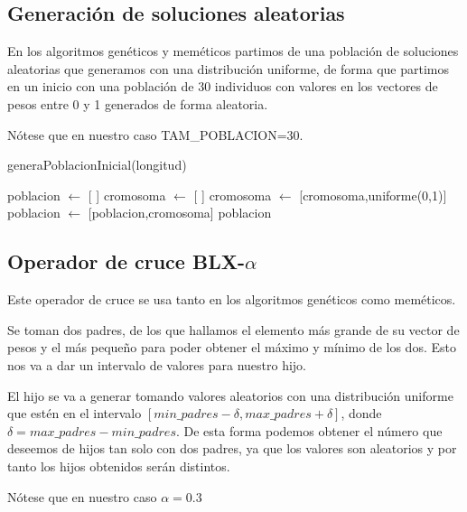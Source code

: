 \documentclass[12pt,a4paper]{article}
\begin{document}
	\subsection{Generación de soluciones aleatorias}
	
	En los algoritmos genéticos y meméticos partimos de una población de soluciones aleatorias que generamos con una distribución uniforme, de forma que partimos en un inicio con una población de 30 individuos con valores en los vectores de pesos entre 0 y 1 generados de forma aleatoria.
	
	Nótese que en nuestro caso TAM\_POBLACION=30.
	
	\begin{algorithm}
		\caption{generaPoblacionInicial(longitud)}
		\begin{algorithmic}
			\STATE poblacion $\leftarrow$ [ ]
				\STATE cromosoma $\leftarrow$ [ ]
					\STATE cromosoma $\leftarrow$ [cromosoma,uniforme(0,1)]
				\ENDFOR
				\STATE poblacion $\leftarrow$ [poblacion,cromosoma]
			\ENDFOR
			\RETURN poblacion
		\end{algorithmic}
	\end{algorithm}
	
	\subsection{Operador de cruce BLX-$\alpha$}
	
	Este operador de cruce se usa tanto en los algoritmos genéticos como meméticos.
	
	Se toman dos padres, de los que hallamos el elemento más grande de su vector de pesos y el más pequeño para poder obtener el máximo y mínimo de los dos. Esto nos va a dar un intervalo de valores para nuestro hijo. 
	
	El hijo se va a generar tomando valores aleatorios con una distribución uniforme que estén en el intervalo $[min\_padres - \delta , max\_padres + \delta]$, donde $\delta = max\_padres - min\_padres$. De esta forma podemos obtener el número que deseemos de hijos tan solo con dos padres, ya que los valores son aleatorios y por tanto los hijos obtenidos serán distintos.
	
	Nótese que en nuestro caso $\alpha=0.3$
	
\end{document}
